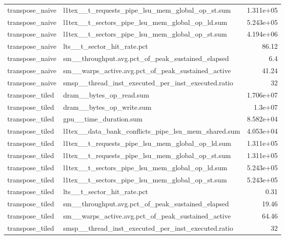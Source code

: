 \begin{longtable}{llr}
transpose\_naive & l1tex\_\_t\_requests\_pipe\_lsu\_mem\_global\_op\_st.sum & 1.311e+05 \\
transpose\_naive & l1tex\_\_t\_sectors\_pipe\_lsu\_mem\_global\_op\_ld.sum & 5.243e+05 \\
transpose\_naive & l1tex\_\_t\_sectors\_pipe\_lsu\_mem\_global\_op\_st.sum & 4.194e+06 \\
transpose\_naive & lts\_\_t\_sector\_hit\_rate.pct & 86.12 \\
transpose\_naive & sm\_\_throughput.avg.pct\_of\_peak\_sustained\_elapsed & 6.4 \\
transpose\_naive & sm\_\_warps\_active.avg.pct\_of\_peak\_sustained\_active & 41.24 \\
transpose\_naive & smsp\_\_thread\_inst\_executed\_per\_inst\_executed.ratio & 32 \\
transpose\_tiled & dram\_\_bytes\_op\_read.sum & 1.706e+07 \\
transpose\_tiled & dram\_\_bytes\_op\_write.sum & 1.3e+07 \\
transpose\_tiled & gpu\_\_time\_duration.sum & 8.582e+04 \\
transpose\_tiled & l1tex\_\_data\_bank\_conflicts\_pipe\_lsu\_mem\_shared.sum & 4.053e+04 \\
transpose\_tiled & l1tex\_\_t\_requests\_pipe\_lsu\_mem\_global\_op\_ld.sum & 1.311e+05 \\
transpose\_tiled & l1tex\_\_t\_requests\_pipe\_lsu\_mem\_global\_op\_st.sum & 1.311e+05 \\
transpose\_tiled & l1tex\_\_t\_sectors\_pipe\_lsu\_mem\_global\_op\_ld.sum & 5.243e+05 \\
transpose\_tiled & l1tex\_\_t\_sectors\_pipe\_lsu\_mem\_global\_op\_st.sum & 5.243e+05 \\
transpose\_tiled & lts\_\_t\_sector\_hit\_rate.pct & 0.31 \\
transpose\_tiled & sm\_\_throughput.avg.pct\_of\_peak\_sustained\_elapsed & 19.46 \\
transpose\_tiled & sm\_\_warps\_active.avg.pct\_of\_peak\_sustained\_active & 64.46 \\
transpose\_tiled & smsp\_\_thread\_inst\_executed\_per\_inst\_executed.ratio & 32 \\
\end{longtable}
